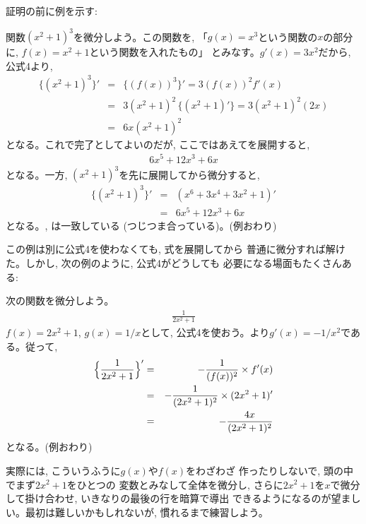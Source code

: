 証明の前に例を示す:

\begin{exmpl}\label{exmpl:bibun_x213}  関数$(x^2+1)^3$を微分しよう。この関数を, 
「$g(x)=x^3$という関数の$x$の部分に, $f(x)=x^2+1$という関数を入れたもの」
とみなす。$g'(x)=3x^2$だから, 公式4より, 
\begin{eqnarray}
\{(x^2+1)^3\}'&=&\{(f(x))^3\}'=3(f(x))^2f'(x)\nonumber\\
               &=&3(x^2+1)^2\,\{(x^2+1)'\}=3(x^2+1)^2(2x)\nonumber\\
               &=&6x(x^2+1)^2\label{eq:diffexample9}
\end{eqnarray}
となる。これで完了としてよいのだが, ここではあえてを展開すると, 
\begin{eqnarray}
6x^5+12x^3+6x\label{eq:diffexample91}
\end{eqnarray}
となる。一方, $(x^2+1)^3$を先に展開してから微分すると,
\begin{eqnarray}
\{(x^2+1)^3\}'&=&(x^6+3x^4+3x^2+1)'\nonumber\\
               &=&6x^5+12x^3+6x\label{eq:diffexample92}
\end{eqnarray}
となる。, は一致している
(つじつま合っている)。(例おわり)\end{exmpl}

この例は別に公式4を使わなくても, 式を展開してから
普通に微分すれば解けた。しかし, 次の例のように, 公式4がどうしても
必要になる場面もたくさんある:\mv

\begin{exmpl} 次の関数を微分しよう。
\begin{eqnarray}\frac{1}{2x^2+1}\end{eqnarray}
$f(x)=2x^2+1$, $g(x)=1/x$として, 
公式4を使おう。より$g'(x)=-1/x^2$である。従って, 
\begin{eqnarray}
\Bigl\{\frac{1}{2x^2+1}\Bigr\}'
&=&-\frac{1}{(f(x))^2}\times f'(x)\nonumber\\
&=&-\frac{1}{(2x^2+1)^2}\times(2x^2+1)'\nonumber\\
     &=&-\frac{4x}{(2x^2+1)^2}\label{eq:diffexample95}
\end{eqnarray}
となる。(例おわり)\end{exmpl}
\mv

実際には, こういうふうに$g(x)$や$f(x)$をわざわざ
作ったりしないで, 頭の中でまず$2x^2+1$をひとつの
変数とみなして全体を微分し, さらに$2x^2+1$を$x$で微分して掛け合わせ, 
いきなりの最後の行を暗算で導出
できるようになるのが望ましい。最初は難しいかもしれないが, 慣れるまで練習しよう。\hv

